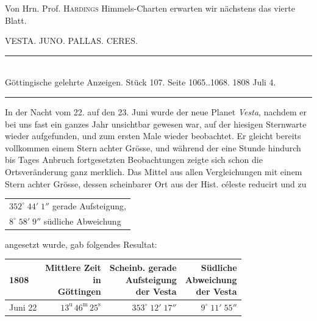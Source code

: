 \par\indent Von Hrn. Prof. \textsc{Hardings} Himmels-Charten erwarten wir nächstens das vierte Blatt.

\begin{center}
VESTA. JUNO. PALLAS. CERES.
\end{center}

\begin{center}
\rule{4cm}{0.4pt}\\
\fontsize{10}{12}\selectfont Göttingische gelehrte Anzeigen. Stück 107. Seite 1065..1068. 1808 Juli 4.\\
\rule{4cm}{0.4pt}
\end{center}

In der Nacht vom 22. auf den 23. Juni wurde der neue Planet \emph{Vesta}, nachdem er
bei uns fast ein ganzes Jahr unsichtbar gewesen war, auf der hiesigen Sternwarte
wieder aufgefunden, und zum ersten Male wieder beobachtet. Er gleicht bereits
vollkommen einem Stern achter Grösse, und während der eine Stunde hindurch bis Tages
Anbruch fortgesetzten Beobachtungen zeigte sich schon die Ortsveränderung ganz
merklich. Das Mittel aus allen Vergleichungen mit einem Stern achter Grösse, dessen
scheinbarer Ort aus der Hist. céleste reducirt und zu


\begin{center}\fontsize{10}{12}\selectfont\setlength{\tabcolsep}{3pt}\renewcommand{\arraystretch}{1.15}\begin{tabular}{l}
$352^\circ\;44'\;1''$ gerade Aufsteigung,\\
$8^\circ\;58'\;9''$ südliche Abweichung
\end{tabular}\end{center}


\noindent angesetzt wurde, gab folgendes Resultat:


\begin{center}\fontsize{10}{12}\selectfont\setlength{\tabcolsep}{3pt}\renewcommand{\arraystretch}{1.15}\begin{tabular}{lrrr}
1808 & \shortstack{Mittlere Zeit\\in\\Göttingen} & \shortstack{Scheinb. gerade\\Aufsteigung\\der Vesta} & \shortstack{Südliche\\Abweichung\\der Vesta}\\\hline
Juni 22 & $13^{\text{u}}\,46^{\text{m}}\,25^{\text{s}}$ & $353^\circ\;12'\;17''$ & $9^\circ\;11'\;55''$\\
\end{tabular}\end{center}


